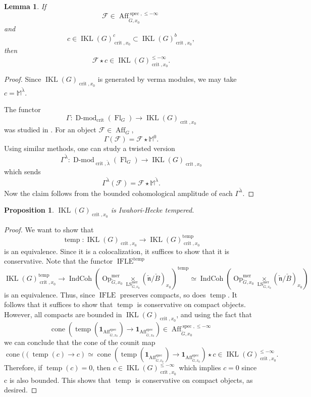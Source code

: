 \documentclass[10pt]{amsart}
\newtheorem{lem}[subsubsection]{Lemma}
\newtheorem{prop}[subsubsection]{Proposition}
\theoremstyle{remark}
\newcommand{\on}[1]{\operatorname{#1}}
\newcommand{\Dmod}{\on{D-mod}}
\newcommand{\IndCoh}{\on{IndCoh}}
\newcommand{\IKLx}{\on{IKL}(G)_{\on{crit}, x_0}}
\newcommand{\Gcheck}{\check{G}}
\newcommand{\ncheck}{\check{\mathfrak{n}}}
\newcommand{\Bcheck}{\check{B}}
\begin{document}
\begin{lem}
    If
    $$
    \mathcal{F} \in \on{Aff}_{\Gcheck, x_0}^{\on{spec}, \leq -\infty}
    $$
    and 
    $$
    c \in \IKLx^c \subset \IKLx^b,
    $$
    then
    $$
    \mathcal{F} \star c \in \IKLx^{\leq -\infty}.
    $$
\end{lem}
\begin{proof}
    Since $\IKLx$ is generated by verma modules, we may take $c = \mathbb{M}^{\check{\lambda}}$.
    
    The functor
    $$
    \Gamma : \Dmod_{\on{crit}}(\on{Fl}_G) \longrightarrow \IKLx
    $$
    was studied in \cite{FG09}. For an object $\mathcal{F} \in \on{Aff}_{G}$, 
    $$
    \Gamma(\mathcal{F}) = \mathcal{F} \star \mathbb{M}^0.
    $$
    Using similar methods, one can study a twisted version
    $$
    \Gamma^{\check{\lambda}} : \Dmod_{\on{crit}, \check{\lambda}}(\on{Fl}_G) \longrightarrow \IKLx
    $$
    which sends
    $$
    \Gamma^{\check{\lambda}}(\mathcal{F}) = \mathcal{F} \star \mathbb{M}^{\check{\lambda}}.
    $$
    Now the claim follows from the bounded cohomological amplitude of each $\Gamma^{\check{\lambda}}$.
\end{proof}

\begin{prop}
    $\IKLx$ is Iwahori-Hecke tempered.
\end{prop}

\begin{proof}
    We want to show that
    $$
    \on{temp} : \IKLx \longrightarrow \IKLx^{\on{temp}}
    $$
    is an equivalence. Since it is a colocalization, it suffices to show that it is conservative.
    Note that the functor $\on{IFLE}^{\on{temp}}$
    $$
    \IKLx^{\on{temp}} \longrightarrow \IndCoh(\on{Op}_{\Gcheck, x_0}^{\on{mer}} \underset{\on{LS}_{\Gcheck, x_0}^{\on{mer}}}{\times} (\ncheck/\Bcheck)_{x_0})^{\on{temp}} \simeq \IndCoh(\on{Op}_{\Gcheck, x_0}^{\on{mer}} \underset{\on{LS}_{\Gcheck, x_0}^{\on{mer}}}{\times} (\ncheck/\Bcheck)_{x_0})
    $$
    is an equivalence. Thus, since $\on{IFLE}$ preserves compacts, so does $\on{temp}$. It follows that it suffices to show that $\on{temp}$ is conservative on compact objects. However, all compacts are bounded in $\IKLx$, and using the fact that
    $$
    \on{cone}(\on{temp}(\boldsymbol{1}_{\on{Aff}_{\Gcheck, x_0}^{\on{spec}}}) \to \boldsymbol{1}_{\on{Aff}_{\Gcheck, x_0}^{\on{spec}}}) \in \on{Aff}_{\Gcheck, x_0}^{\on{spec}, \leq -\infty}
    $$
    we can conclude that the cone of the counit map
    $$
    \on{cone}((\on{temp}(c) \to c) \simeq \on{cone}(\on{temp}(\boldsymbol{1}_{\on{Aff}_{\Gcheck, x_0}^{\on{spec}}}) \to \boldsymbol{1}_{\on{Aff}_{\Gcheck, x_0}^{\on{spec}}}) \star c \in \IKLx^{\leq - \infty}.
    $$
    Therefore, if $\on{temp}(c) = 0$, then $c \in \IKLx^{\leq - \infty}$ which implies $c = 0$ since c is also bounded. This shows that $\on{temp}$ is conservative on compact objects, as desired.
\end{proof}
\end{document}
